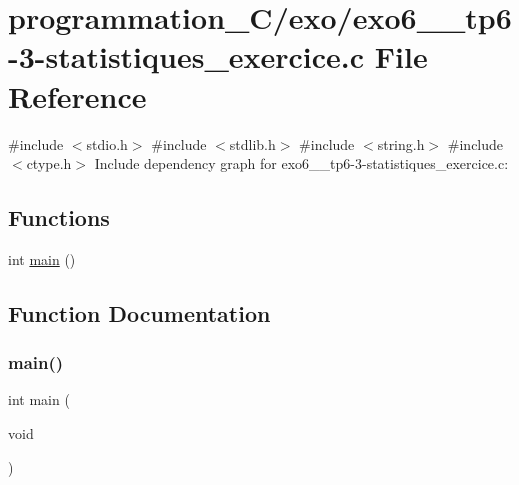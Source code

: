 \hypertarget{exo6__3__tp6-3-statistiques__exercice_8c}{}\section{programmation\+\_\+\+C/exo/exo6\+\_\+\_\+tp6-\/3-\/statistiques\+\_\+exercice.c File Reference}
\label{exo6__3__tp6-3-statistiques__exercice_8c}
{\ttfamily \#include $<$stdio.\+h$>$}\newline
{\ttfamily \#include $<$stdlib.\+h$>$}\newline
{\ttfamily \#include $<$string.\+h$>$}\newline
{\ttfamily \#include $<$ctype.\+h$>$}\newline
Include dependency graph for exo6\+\_\+\_\+tp6-\/3-\/statistiques\+\_\+exercice.c\+:
\subsection*{Functions}
\begin{DoxyCompactItemize}
\item 
int \hyperlink{exo6__3__tp6-3-statistiques__exercice_8c_ae66f6b31b5ad750f1fe042a706a4e3d4}{main} ()
\end{DoxyCompactItemize}


\subsection{Function Documentation}
\mbox{\label{exo6__3__tp6-3-statistiques__exercice_8c_ae66f6b31b5ad750f1fe042a706a4e3d4}} 
\subsubsection{\texorpdfstring{main()}{main()}}
{\footnotesize\ttfamily int main (\begin{DoxyParamCaption}\item[{void}]{ }\end{DoxyParamCaption})}

